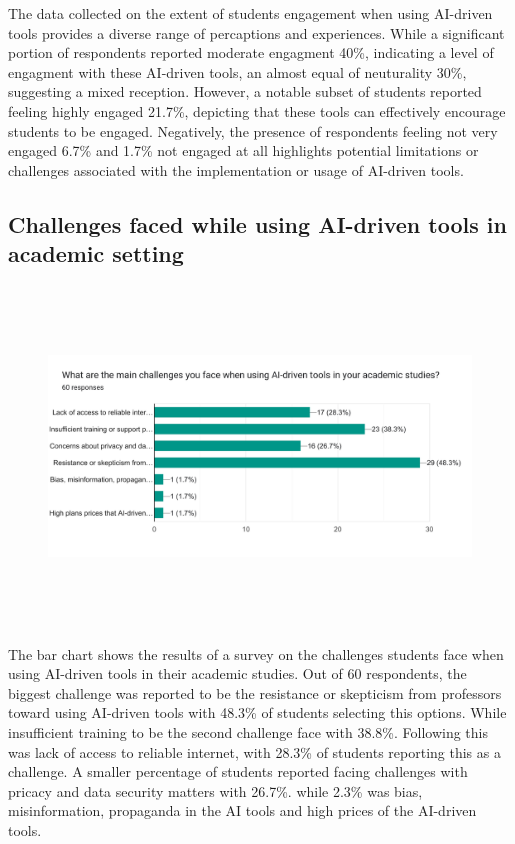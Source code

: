 The data collected on the extent of students engagement when using AI-driven tools
provides a diverse range of percaptions and experiences. While a significant portion
of respondents reported moderate engagment 40\%, indicating a level of engagment with
these AI-driven tools, an almost equal of neuturality 30\%, suggesting a mixed reception.
However, a notable subset of students reported feeling highly engaged 21.7\%, depicting that
these tools can effectively encourage students to be engaged. Negatively, the presence
of respondents feeling not very engaged 6.7\% and 1.7\% not engaged at all highlights potential
limitations or challenges associated with the implementation or usage of AI-driven tools.


\subsection{Challenges faced while using AI-driven tools in academic setting}

\begin{figure}[H]
	\centering
	\includegraphics[width=17cm, height=9cm]{./chap4/figures/chall}
\end{figure}

The bar chart shows the results of a survey on the challenges students
face when using AI-driven tools in their academic studies. Out of 60 respondents,
the biggest challenge was reported to be the resistance or skepticism from professors
toward using AI-driven tools with 48.3\% of students selecting this options. 
While insufficient training to be the second challenge
face with 38.8\%.
Following this was lack of access to reliable internet, with 28.3\% of students
reporting this as a challenge.
A smaller percentage of students reported facing challenges with pricacy and data security matters
with 26.7\%. while 2.3\% was bias, misinformation, propaganda in the AI tools and high prices of the AI-driven tools.

